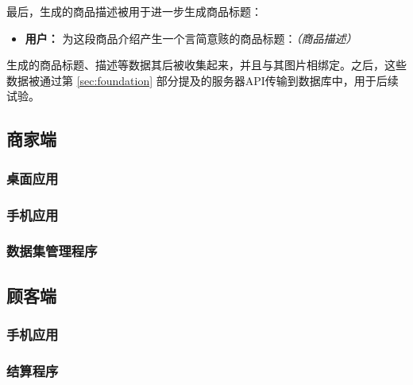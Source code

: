 最后，生成的商品描述被用于进一步生成商品标题：

\begin{itemize}
    \item[] \textbf{用户：} 为这段商品介绍产生一个言简意赅的商品标题：\textit{（商品描述）}
\end{itemize}

生成的商品标题、描述等数据其后被收集起来，并且与其图片相绑定。之后，这些数据被通过第 \ref{sec:foundation} 部分提及的服务器API传输到数据库中，用于后续试验。

\subsection{商家端}

\subsubsection{桌面应用}

\subsubsection{手机应用}

\subsubsection{数据集管理程序}

\subsection{顾客端}

\subsubsection{手机应用}

\subsubsection{结算程序}